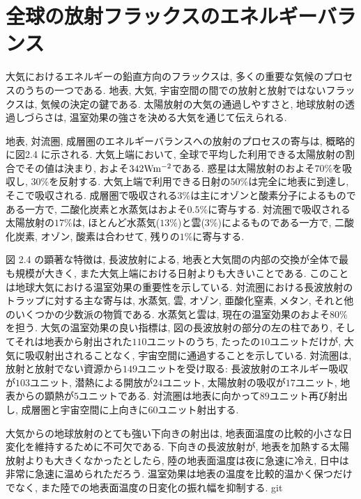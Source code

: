 \documentclass[a4j,12pt,openbib,oneside,dvipdfmx]{jbook}
\begin{document}
\newpage
{}
\section{全球の放射フラックスのエネルギーバランス}
大気におけるエネルギーの鉛直方向のフラックスは, 多くの重要な気候のプロセスのうちの一つである. 地表, 大気, 宇宙空間の間での放射と放射ではないフラックスは, 気候の決定の鍵である. 太陽放射の大気の通過しやすさと, 地球放射の透過しづらさは, 温室効果の強さを決める大気を通じて伝えられる.
\par
地表, 対流圏, 成層圏のエネルギーバランスへの放射のプロセスの寄与は, 概略的に図2.4 に示される. 大気上端において, 全球で平均した利用できる太陽放射の割合でその値は決まり, およそ$342 \rm{W}\rm{m}^{-2}$である. 
惑星は太陽放射のおよそ$70\%$を吸収し, $30\%$を反射する. 大気上端で利用できる日射の$50\%$は完全に地表に到達し, そこで吸収される. 成層圏で吸収される$3\%$は主にオゾンと酸素分子によるものである一方で, 二酸化炭素と水蒸気はおよそ$0.5\%$に寄与する. 
対流圏で吸収される太陽放射の$17\%$は, ほとんど水蒸気($13\%$)と雲($3\%$)によるものである一方で, 二酸化炭素, オゾン, 酸素は合わせて, 残りの$1\%$に寄与する. 
\par
図 2.4 の顕著な特徴は, 長波放射による, 地表と大気間の内部の交換が全体で最も規模が大きく, また大気上端における日射よりも大きいことである. 
このことは地球大気における温室効果の重要性を示している. 対流圏における長波放射のトラップに対する主な寄与は, 水蒸気, 雲, オゾン, 亜酸化窒素, メタン, それと他のいくつかの少数派の物質である. 水蒸気と雲は, 現在の温室効果のおよそ$80\%$を担う. 
大気の温室効果の良い指標は, 図の長波放射の部分の左の柱であり, そしてそれは地表から射出された$110$ユニットのうち, たったの$10$ユニットだけが, 大気に吸収射出されることなく, 宇宙空間に通過することを示している. 
対流圏は, 放射と放射でない資源から$149$ユニットを受け取る: 長波放射のエネルギー吸収が$103$ユニット, 潜熱による開放が$24$ユニット, 太陽放射の吸収が$17$ユニット, 地表からの顕熱が$5$ユニットである. 
対流圏は地表に向かって$89$ユニット再び射出し, 成層圏と宇宙空間に上向きに$60$ユニット射出する.
\par
大気からの地球放射のとても強い下向きの射出は, 地表面温度の比較的小さな日変化を維持するために不可欠である. 下向きの長波放射が, 地表を加熱する太陽放射よりも大きくなかったとしたら, 陸の地表面温度は夜に急速に冷え, 日中は非常に急速に温められただろう. 温室効果は地表の温度を比較的温かく保つだけでなく, また陸での地表面温度の日変化の振れ幅を抑制する.
git
\end{document}
